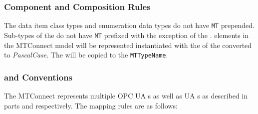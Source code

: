 \subsubsection{Component and Composition  Rules}

The data item class types and enumeration data types do not have \texttt{MT} prepended. Sub-types of the  do not have \texttt{MT} prefixed with the exception of the .  elements in the MTConnect model will be represented instantiated with the  of the   converted to \textit{PascalCase}. The  will be copied to the  \texttt{MTTypeName}.

\subsubsection{  and  Conventions}

The MTConnect  represents multiple OPC UA s as well as UA s as described in parts \cite{UAPart8} and \cite{UAPart9} respectively. The mapping rules are as follows:

